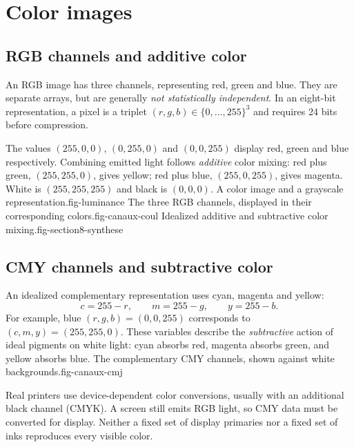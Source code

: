 \section{Color images}
\subsection{RGB channels and additive color}
An RGB image has three channels, representing red, green and blue. They are separate arrays, but are generally \emph{not statistically independent}. In an eight-bit representation, a pixel is a triplet $(r,g,b)\in\{0,\ldots,255\}^3$ and requires 24 bits before compression.

The values $(255,0,0)$, $(0,255,0)$ and $(0,0,255)$ display red, green and blue respectively. Combining emitted light follows \emph{additive} color mixing: red plus green, $(255,255,0)$, gives yellow; red plus blue, $(255,0,255)$, gives magenta. White is $(255,255,255)$ and black is $(0,0,0)$.
{A color image and a grayscale representation.}{fig-luminance}
{The three RGB channels, displayed in their corresponding colors.}{fig-canaux-coul}
{Idealized additive and subtractive color mixing.}{fig-section8-synthese}

\subsection{CMY channels and subtractive color}
An idealized complementary representation uses cyan, magenta and yellow:
\[
 c=255-r,\qquad m=255-g,\qquad y=255-b.
\]
For example, blue $(r,g,b)=(0,0,255)$ corresponds to $(c,m,y)=(255,255,0)$. These variables describe the \emph{subtractive} action of ideal pigments on white light: cyan absorbs red, magenta absorbs green, and yellow absorbs blue.
{The complementary CMY channels, shown against white backgrounds.}{fig-canaux-cmj}

Real printers use device-dependent color conversions, usually with an additional black channel (CMYK). A screen still emits RGB light, so CMY data must be converted for display. Neither a fixed set of display primaries nor a fixed set of inks reproduces every visible color.

